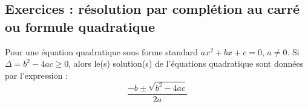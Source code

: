 \documentclass[main.tex]{subfiles}
\begin{document}
%	 

\newpage 
{}  
\pagestyle{scrheadings} %
\onehalfspacing
\subsection{Exercices : résolution par complétion au carré ou formule quadratique}

\begin{eBox}
Pour une équation quadratique sous forme standard $ax^2+bx+c=0$, $a\neq 0$. Si $\Delta=b^2-4ac\geqslant 0$, alors le(s) solution(s) de l'équations quadratique sont données par l'expression : 
\setlength{\abovedisplayskip}{3pt}
\setlength{\belowdisplayskip}{3pt}
$$\frac{-b\pm \sqrt{b^2-4ac}}{2a}$$  
\end{eBox}
\end{document}
